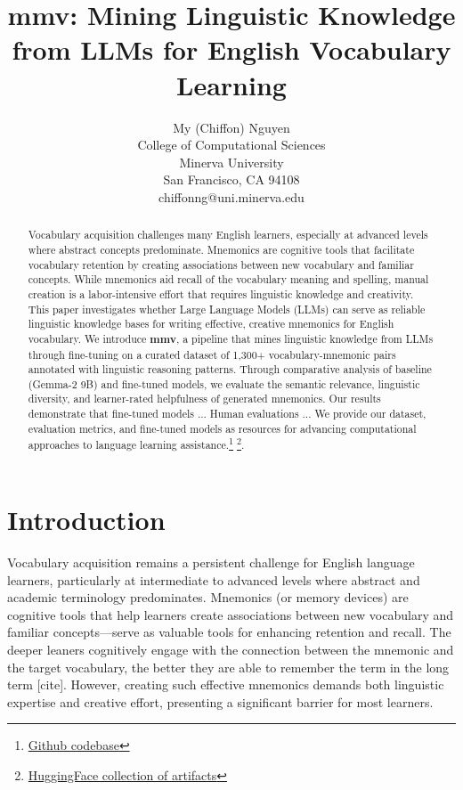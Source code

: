 \documentclass{article}
\title{mmv: Mining Linguistic Knowledge from LLMs for English Vocabulary Learning}
\author{%
  My (Chiffon) Nguyen \\
  College of Computational Sciences \\
  Minerva University \\
  San Francisco, CA 94108 \\
  chiffonng@uni.minerva.edu
}
\newcounter{para}
\newcommand{\shorttitle}{\textbf{mmv}}
\begin{document}
\maketitle

\begin{abstract}
Vocabulary acquisition challenges many English learners, especially at advanced levels where abstract concepts predominate. Mnemonics are cognitive tools that facilitate vocabulary retention by creating associations between new vocabulary and familiar concepts.
While mnemonics aid recall of the vocabulary meaning and spelling, manual creation is a labor-intensive effort that requires linguistic knowledge and creativity. This paper investigates whether Large Language Models (LLMs) can serve as reliable linguistic knowledge bases for writing effective, creative mnemonics for English vocabulary. We introduce \shorttitle, a pipeline that mines linguistic knowledge from LLMs through fine-tuning on a curated dataset of 1,300+ vocabulary-mnemonic pairs annotated with linguistic reasoning patterns. Through comparative analysis of baseline (Gemma-2 9B) and fine-tuned models, we evaluate the semantic relevance, linguistic diversity, and learner-rated helpfulness of generated mnemonics. Our results demonstrate that fine-tuned models ... Human evaluations ... We provide our dataset, evaluation metrics, and fine-tuned models as resources for advancing computational approaches to language learning assistance.\footnote{\href{https://github.com/chiffonng/mnemonic-gen}{Github codebase}}  \footnote{\href{https://huggingface.co/collections/chiffonng/vocab-mnemonic-mining-67563a0a1ab91e84e9827579}{HuggingFace collection of artifacts}}.
\end{abstract}

\section{Introduction} \label{sec:intro}
Vocabulary acquisition remains a persistent challenge for English language learners, particularly at intermediate to advanced levels where abstract and academic terminology predominates. Mnemonics (or memory devices) are cognitive tools that help learners create associations between new vocabulary and familiar concepts—serve as valuable tools for enhancing retention and recall. The deeper leaners cognitively engage with the connection between the mnemonic and the target vocabulary, the better they are able to remember the term in the long term [cite]. However, creating such effective mnemonics demands both linguistic expertise and creative effort, presenting a significant barrier for most learners.
\end{document}
